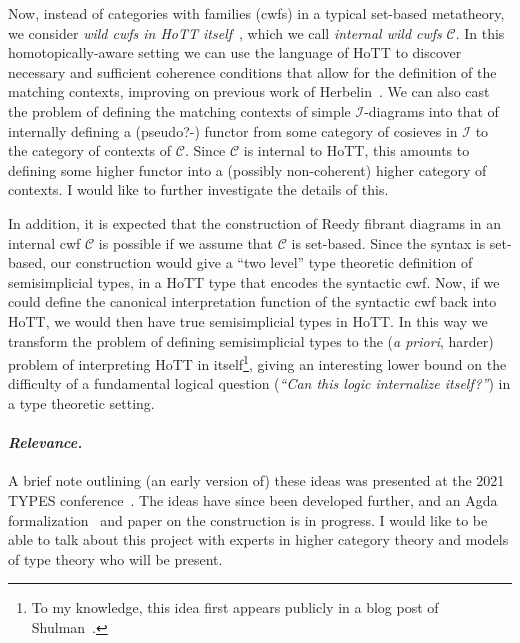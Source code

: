 \documentclass[a4paper]{article}
\newcommand{\C}{\mathcal C}
\newcommand{\I}{\mathcal I}
\begin{document}
Now, instead of categories with families (cwfs) in a typical set-based metatheory, we consider \emph{wild cwfs in HoTT itself}~\cite{kraus:21:internal}, which we call \emph{internal wild cwfs} $\C$.
In this homotopically-aware setting we can use the language of HoTT to discover necessary and sufficient coherence conditions that allow for the definition of the matching contexts, improving on previous work of Herbelin~\cite{herbelin:15:semisimplicial}.
We can also cast the problem of defining the matching contexts of simple $\I$-diagrams into that of internally defining a (pseudo?-) functor from some category of cosieves in $\I$ to the category of contexts of $\C$.
Since $\C$ is internal to HoTT, this amounts to defining some higher functor into a (possibly non-coherent) higher category of contexts.
I would like to further investigate the details of this.

In addition, it is expected that the construction of Reedy fibrant diagrams in an internal cwf $\C$ is possible if we assume that $\C$ is set-based.
Since the syntax is set-based, our construction would give a ``two level'' type theoretic definition of semisimplicial types, in a HoTT type that encodes the syntactic cwf.
Now, if we could define the canonical interpretation function of the syntactic cwf back into HoTT, we would then have true semisimplicial types in HoTT.
In this way we transform the problem of defining semisimplicial types to the (\textit{a priori}, harder) problem of interpreting HoTT in itself\footnote{To my knowledge, this idea first appears publicly in a blog post of Shulman~\cite{shulman:14:hott-should-eat-itself}.}, giving an interesting lower bound on the difficulty of a fundamental logical question (\textit{``Can this logic internalize itself?''}) in a type theoretic setting.

\paragraph{\normalfont\textit{Relevance.}} A brief note outlining (an early version of) these ideas was presented at the 2021 TYPES conference~\cite{chen-kraus:21:internal}.
The ideas have since been developed further, and an Agda formalization~\cite{chen-kraus:23:internal-diagrams} and paper on the construction is in progress.
I would like to be able to talk about this project with experts in higher category theory and models of type theory who will be present.
\end{document}
